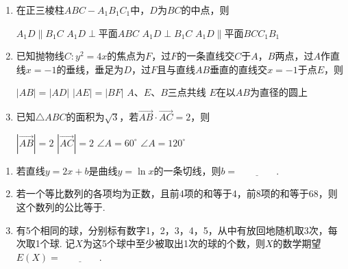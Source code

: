 \documentclass[12pt,a4paper]{article}
\begin{document}
	\begin{enumerate}[leftmargin=*,label=\arabic*.,resume,itemsep=0.8ex]
		\item 在正三棱柱$ABC-A_1B_1C_1$中，$D$为$BC$的中点，则
		
		\begin{choicesTwo}
			\choice $A_1D\parallel B_1C$ \choice $A_1D\perp$平面$ABC$ \choice $A_1D\perp B_1C$ \choice $A_1D\parallel$平面$BCC_1B_1$
		\end{choicesTwo}
		
		\item 已知抛物线$C:y^2=4x$的焦点为$F$，过$F$的一条直线交$C$于$A$，$B$两点，过$A$作直线$x=-1$的垂线，垂足为$D$，过$F$且与直线$AB$垂直的直线交$x=-1$于点$E$，则
		
		\begin{choicesTwo}
			\choice $|AB|=|AD|$ \choice $|AE|=|BF|$ \choice $A$、$E$、$B$三点共线 \choice $E$在以$AB$为直径的圆上
		\end{choicesTwo}
		
		\item 已知$\triangle ABC$的面积为$\sqrt{3}$，若$\overrightarrow{AB}\cdot\overrightarrow{AC}=2$，则
		
		\begin{choicesTwo}
			\choice $|\overrightarrow{AB}|=2$ \choice $|\overrightarrow{AC}|=2$ \choice $\angle A=60^\circ$ \choice $\angle A=120^\circ$
		\end{choicesTwo}
	\end{enumerate}
	
	\vspace{0.3cm}
	
	
	\begin{enumerate}[leftmargin=*,label=\arabic*.,resume,itemsep=0.8ex]
		\item 若直线$y=2x+b$是曲线$y=\ln x$的一条切线，则$b=\underline{\qquad\qquad}$. 
		
		\item 若一个等比数列的各项均为正数，且前4项的和等于4，前8项的和等于68，则这个数列的公比等于\underline{\qquad\qquad}. 
		
		\item 有5个相同的球，分别标有数字1，2，3，4，5，从中有放回地随机取3次，每次取1个球. 记$X$为这5个球中至少被取出1次的球的个数，则$X$的数学期望$E(X)=\underline{\qquad\qquad}$. 
	\end{enumerate}
	
\end{document}

